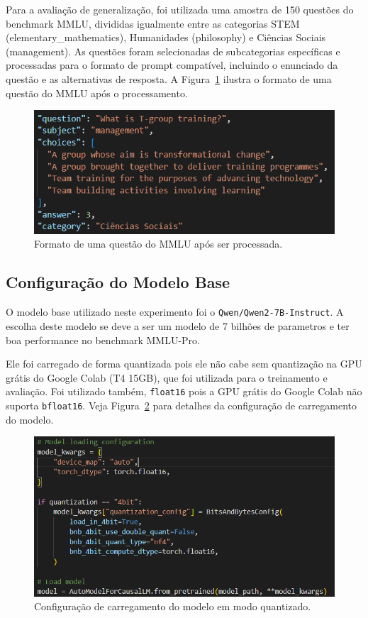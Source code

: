 \documentclass[journal,onecolumn]{IEEEtran}
\newcommand{\figwidth}{0.7\linewidth}
\begin{document}
Para a avaliação de generalização, foi utilizada uma amostra de 150 questões do benchmark MMLU, divididas igualmente entre as categorias STEM (elementary\_mathematics), Humanidades (philosophy) e Ciências Sociais (management). As questões foram selecionadas de subcategorias específicas e processadas para o formato de prompt compatível, incluindo o enunciado da questão e as alternativas de resposta. A Figura~\ref{fig:mmlu_processed} ilustra o formato de uma questão do MMLU após o processamento.
\begin{figure}[!htpb]
    \centering
    \includegraphics[width=\figwidth]{resources/mmlu_processed.png}
    \caption{Formato de uma questão do MMLU após ser processada.}
    \label{fig:mmlu_processed}
\end{figure}

\subsection{Configuração do Modelo Base}

O modelo base utilizado neste experimento foi o \texttt{Qwen/Qwen2-7B-Instruct}. A escolha deste modelo se deve a ser um modelo de 7 bilhões de parametros e ter boa performance no benchmark MMLU-Pro.

Ele foi carregado de forma quantizada pois ele não cabe sem quantização na GPU grátis do Google Colab (T4 15GB), que foi utilizada para o treinamento e avaliação. Foi utilizado também, \texttt{float16} pois a GPU grátis do Google Colab não suporta \texttt{bfloat16}. Veja Figura~\ref{fig:base_model_config} para detalhes da configuração de carregamento do modelo.

\begin{figure}[!htpb]
    \centering
    \includegraphics[width=\figwidth]{resources/base_model_config.png}
    \caption{Configuração de carregamento do modelo em modo quantizado.}
    \label{fig:base_model_config}
\end{figure}
\end{document}
